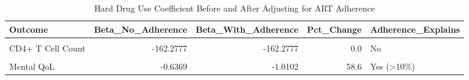 \begin{table}[!h]
\centering
\caption{\label{tab:adherence-mediation}Hard Drug Use Coefficient Before and After Adjusting for ART Adherence}
\centering
\begin{tabular}[t]{lrrrl}
\toprule
Outcome & Beta\_No\_Adherence & Beta\_With\_Adherence & Pct\_Change & Adherence\_Explains\\
\midrule
\cellcolor{gray!10}{Log10 Viral Load} & \cellcolor{gray!10}{-0.0023} & \cellcolor{gray!10}{-0.0023} & \cellcolor{gray!10}{0.0} & \cellcolor{gray!10}{No}\\
CD4+ T Cell Count & -162.2777 & -162.2777 & 0.0 & No\\
\cellcolor{gray!10}{Physical QoL} & \cellcolor{gray!10}{-3.2239} & \cellcolor{gray!10}{-3.1866} & \cellcolor{gray!10}{-1.2} & \cellcolor{gray!10}{No}\\
Mental QoL & -0.6369 & -1.0102 & 58.6 & Yes (>10\%)\\
\bottomrule
\end{tabular}
\end{table}
